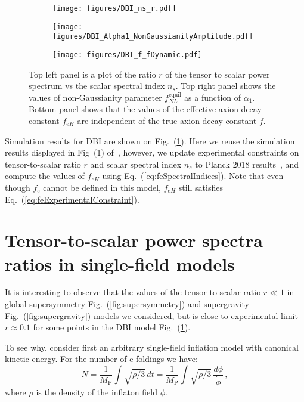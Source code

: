 \documentclass[12pt]{article}
\begin{document}
\begin{figure}
  \centering
  \begin{subfigure}{0.45 \textwidth}
    \texttt{[image: figures/DBI\_ns\_r.pdf]}
  \end{subfigure}
  \begin{subfigure}{0.45 \textwidth}
    \texttt{[image: figures/DBI\_Alpha1\_NonGaussianityAmplitude.pdf]}
  \end{subfigure}
  \begin{subfigure}{0.45 \textwidth}
    \texttt{[image: figures/DBI\_f\_fDynamic.pdf]}
  \end{subfigure}
  \caption{\protect
    Top left panel is a plot of the ratio $r$ of the tensor to scalar power spectrum vs the scalar spectral index $n_s$.
    Top right panel shows the values of non-Gaussianity parameter $f_{NL}^\text{equil}$ as a function of $\alpha_1$.
    Bottom panel shows that the values of the effective axion decay constant $f_{eH}$ are independent of the true axion decay constant $f$.} \label{fig:DBI}
\end{figure}

Simulation results for DBI are shown on Fig.~(\ref{fig:DBI}).
Here we reuse the simulation results displayed in Fig~(1) of~\cite{Nath:2018xxe}, however, we update experimental constraints on tensor-to-scalar ratio $r$ and scalar spectral index $n_s$ to Planck 2018 results~\cite{Akrami:2018odb}, and compute the values of $f_{eH}$ using Eq.~(\ref{eq:feSpectralIndices}).
Note that even though $f_e$ cannot be defined in this model, $f_{eH}$ still satisfies Eq.~(\ref{eq:feExperimentalConstraint}).

\section{Tensor-to-scalar power spectra ratios in single-field models \label{sec:r}}
It is interesting to observe that the values of the tensor-to-scalar ratio $r \ll 1$ in global supersymmetry Fig.~(\ref{fig:supersymmetry}) and supergravity Fig.~(\ref{fig:supergravity}) models we considered, but is close to experimental limit $r \approx 0.1$ for some points in the DBI model Fig.~(\ref{fig:DBI}).

To see why, consider first an arbitrary single-field inflation model with canonical kinetic energy.
For the number of e-foldings we have:
\begin{equation} \label{eq:efoldingsGeneral}
  N = \frac{1}{M_\text{P}} \int \sqrt{\rho / 3}\,dt
    = \frac{1}{M_\text{P}} \int \sqrt{\rho / 3}\,\frac{d\phi}{\dot \phi}\,,
\end{equation}
where $\rho$ is the density of the inflaton field $\phi$.
\end{document}
